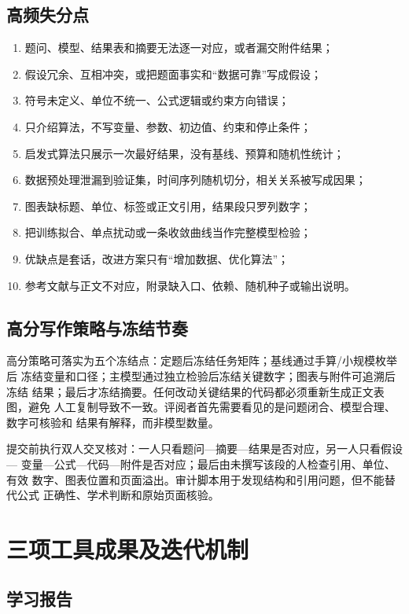 \documentclass[UTF8,a4paper,12pt]{ctexart}
\begin{document}
{\subsection{高频失分点}

\begin{enumerate}
  \item 题问、模型、结果表和摘要无法逐一对应，或者漏交附件结果；
  \item 假设冗余、互相冲突，或把题面事实和“数据可靠”写成假设；
  \item 符号未定义、单位不统一、公式逻辑或约束方向错误；
  \item 只介绍算法，不写变量、参数、初边值、约束和停止条件；
  \item 启发式算法只展示一次最好结果，没有基线、预算和随机性统计；
  \item 数据预处理泄漏到验证集，时间序列随机切分，相关关系被写成因果；
  \item 图表缺标题、单位、标签或正文引用，结果段只罗列数字；
  \item 把训练拟合、单点扰动或一条收敛曲线当作完整模型检验；
  \item 优缺点是套话，改进方案只有“增加数据、优化算法”；
  \item 参考文献与正文不对应，附录缺入口、依赖、随机种子或输出说明。
\end{enumerate}

\subsection{高分写作策略与冻结节奏}

高分策略可落实为五个冻结点：定题后冻结任务矩阵；基线通过手算/小规模枚举后
冻结变量和口径；主模型通过独立检验后冻结关键数字；图表与附件可追溯后冻结
结果；最后才冻结摘要。任何改动关键结果的代码都必须重新生成正文表图，避免
人工复制导致不一致。评阅者首先需要看见的是问题闭合、模型合理、数字可核验和
结果有解释，而非模型数量。

提交前执行双人交叉核对：一人只看题问—摘要—结果是否对应，另一人只看假设—
变量—公式—代码—附件是否对应；最后由未撰写该段的人检查引用、单位、有效
数字、图表位置和页面溢出。审计脚本用于发现结构和引用问题，但不能替代公式
正确性、学术判断和原始页面核验。

\section{三项工具成果及迭代机制}

\subsection{学习报告}

}
\end{document}
